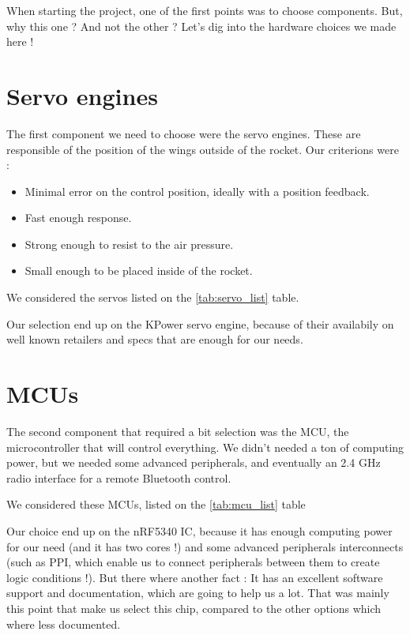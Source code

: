 When starting the project, one of the first points was to choose components.
But, why this one ? And not the other ? Let's dig into the hardware choices we
made here !

\section{Servo engines}
The first component we need to choose were the servo engines. These are
responsible of the position of the wings outside of the rocket. Our criterions
were :
\begin{itemize}
    \item   Minimal error on the control position, ideally with a position feedback.
    \item   Fast enough response.
    \item   Strong enough to resist to the air pressure.
    \item   Small enough to be placed inside of the rocket.
\end{itemize}

We considered the servos listed on the \ref{tab:servo_list} table.



Our selection end up on the KPower servo engine, because of their availabily on
well known retailers and specs that are enough for our needs.

\section{MCUs}
The second component that required a bit selection was the MCU, the
microcontroller that will control everything. We didn't needed a ton of
computing power, but we needed some advanced peripherals, and eventually an 2.4
GHz radio interface for a remote Bluetooth control.

We considered these MCUs, listed on the \ref{tab:mcu_list} table



Our choice end up on the nRF5340 IC, because it has enough computing power for
our need (and it has two cores !) and some advanced peripherals interconnects
(such as PPI, which enable us to connect peripherals between them to create
logic conditions !). But there where another fact : It has an excellent
software support and documentation, which are going to help us a lot. That was
mainly this point that make us select this chip, compared to the other options
which where less documented.

